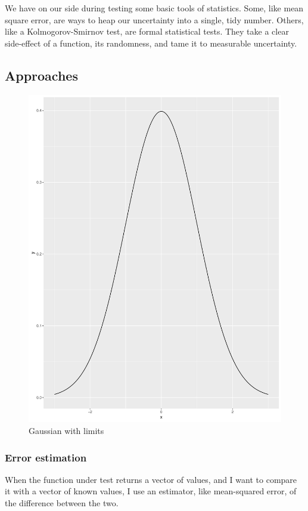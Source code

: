 \documentclass[fleqn,10pt]{olplainarticle}
\begin{document}
We have on our side during testing some basic tools
of statistics. Some, like mean square error, are ways
to heap our uncertainty into a single, tidy number.
Others, like a Kolmogorov-Smirnov test, are formal statistical
tests. They take a clear side-effect of a function,
its randomness, and tame it to measurable uncertainty.


\subsection{Approaches}
\begin{figure}
    \centering
    \includegraphics[scale=0.25]{gaussianlimits.pdf}
    \caption{Gaussian with limits}
    \label{fig:gaussian-limits}
\end{figure}
\subsubsection{Error estimation}
When the function under test returns a vector of values,
and I want to compare it with a vector of known values,
I use an estimator, like mean-squared error, of the difference
between the two.
\end{document}
